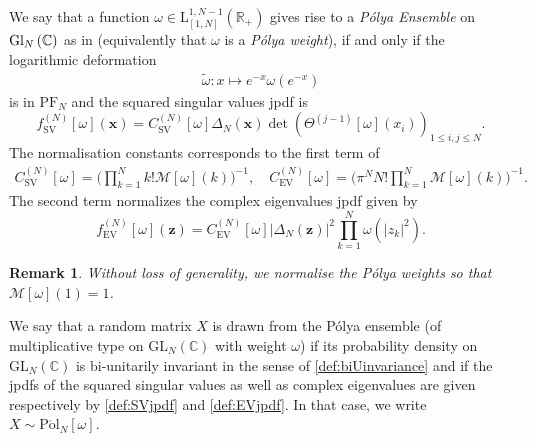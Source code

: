 \documentclass[pdflatex,sn-mathphys-num]{sn-jnl}
\theoremstyle{thmstyleone}
\newtheorem{remark}[theorem]{Remark}
\numberwithin{equation}{section}
\newcommand{\R}{\mathbb{R}}
\newcommand{\C}{\mathbb{C}}
\begin{document}
 
We say that a function $\omega\in\mathrm{L}^{1,N-1}_{\left [ 1,N \right ]}\left ( \R_{+} \right )$ gives rise to a \textit{P\'olya Ensemble} on ${\rm Gl}_{N}\left(\C\right)$ as in  \cite[Eq.~(2.17)]{forsterPolynomialEnsemblesPolya2021} (equivalently that $\omega$ is a \textit{P\'olya weight}), if and only if the logarithmic deformation
\begin{align}\label{def:polyaweight}
    \widetilde{\omega}:x\mapsto e^{-x}\omega\left ( e^{-x} \right )
\end{align}
is in $\mathrm{PF}_{N}$ and the squared singular values jpdf is
\begin{equation}\label{def:SVjpdf}
    f^{\left ( N \right )}_{\mathrm{SV}}\left [ \omega \right ](\mathbf{x})= C^{\left ( N \right )}_{\mathrm{SV}}\left [ \omega \right ]\Delta_{N}\left ( \mathbf{x} \right )\det\left(\Theta^{\left(j-1\right)}\left [ \omega \right ]\left ( x_{i} \right )\right)_{1\leq i,j\leq N}.
\end{equation}
The normalisation constants corresponds to the first term of 
\begin{align}\label{normalization1}
    C^{\left ( N \right )}_{\mathrm{SV}}\left [ \omega \right ]=\Big(\prod\limits_{k=1}^{N}k!\mathcal{M}\left [ \omega \right ]\left ( k \right )\Big)^{-1}, \quad C^{\left ( N \right )}_{\mathrm{EV}}\left [ \omega \right ]=\Big(\pi^N N!\prod\limits_{k=1}^{N}\mathcal{M}\left [ \omega \right ]\left ( k \right )\Big)^{-1}.
\end{align}
The second term normalizes the complex eigenvalues jpdf given by
\begin{equation}\label{def:EVjpdf}
            f^{\left ( N \right )}_{\mathrm{EV}}\left [ \omega \right ](\mathbf{z})= C^{\left ( N \right )}_{\mathrm{EV}}\left [ \omega \right ]\left |\Delta_{N}\left ( \mathbf{z} \right )  \right |^{2}\prod\limits_{k=1}^{N}\omega\left ( \left | z_{k} \right |^{2} \right ).
\end{equation}
\begin{remark}
Without loss of generality, we normalise the P\'olya weights so that $\mathcal{M}[\omega](1)=1$.
\end{remark}
We say that a random matrix $X$ is drawn from the P\'olya ensemble (of multiplicative type on $\mathrm{GL}_{N}(\C)$ with weight $\omega$) if its probability density on $\mathrm{GL}_{N}(\C)$ is bi-unitarily invariant in the sense of \eqref{def:biUinvariance} and if the  jpdfs of the squared singular values as well as complex eigenvalues are given respectively by \eqref{def:SVjpdf} and \eqref{def:EVjpdf}. In that case, we write $X\sim\mathrm{P\acute{o}l}_{N}\left [ \omega \right ]$.
\end{document}

